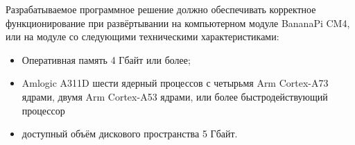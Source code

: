 Разрабатываемое программное решение должно обеспечивать корректное
функционирование при развёртывании на компьютерном модуле BananaPi CM4, или
на модуле со следующими техническими характеристиками:

\begin{itemize}
	\item Оперативная память 4 Гбайт или более;
	\item Amlogic A311D шести ядерный процессов с четырьмя Arm Cortex-A73
		ядрами, двумя Arm Cortex-A53 ядрами, или более быстродействующий
		процессор
	\item доступный объём дискового пространства 5 Гбайт. %
\end{itemize}
